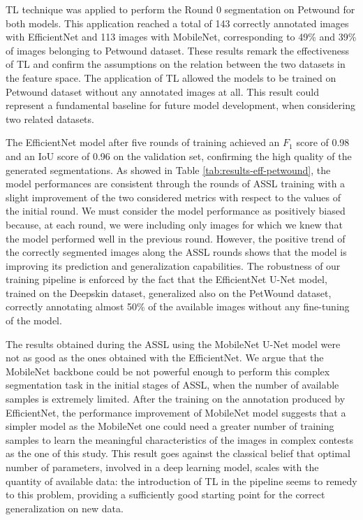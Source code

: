 \documentclass[../main.tex]{subfiles}
\begin{document}
TL technique was applied to perform the Round 0 segmentation on Petwound for both models. 
This application reached a total of 143 correctly annotated images with EfficientNet and 113 images with MobileNet, corresponding to 49\% and 39\% of images belonging to Petwound dataset. 
These results remark the effectiveness of TL and confirm the assumptions on the relation between the two datasets in the feature space. 
The application of TL allowed the models to be trained on Petwound dataset without any annotated images at all.
This result could represent a fundamental baseline for future model development, when considering two related datasets.

The EfficientNet model after five rounds of training achieved an $F_1$ score of 0.98 and an IoU score of 0.96 on the validation set, confirming the high quality of the generated segmentations.
As showed in Table \ref{tab:results-eff-petwound}, the model performances are consistent through the rounds of ASSL training with a slight improvement of the two considered metrics with respect to the values of the initial round. 
We must consider the model performance as positively biased because, at each round, we were including only images for which we knew that the model performed well in the previous round.
However, the positive trend of the correctly segmented images along the ASSL rounds shows that the model is improving its prediction and generalization capabilities. 
The robustness of our training pipeline is enforced by the fact that the EfficientNet U-Net model, trained on the Deepskin dataset, generalized also on the PetWound dataset, correctly annotating almost 50\% of the available images without any fine-tuning of the model.

The results obtained during the ASSL using the MobileNet U-Net model were not as good as the ones obtained with the EfficientNet.
We argue that the MobileNet backbone could be not powerful enough to perform this complex segmentation task in the initial stages of ASSL, when the number of available samples is extremely limited. 
After the training on the annotation produced by EfficientNet, the performance improvement of MobileNet model suggests that a simpler model as the MobileNet one could need a greater number of training samples to learn the meaningful characteristics of the images in complex contests as the one of this study.
This result goes against the classical belief that optimal number of parameters, involved in a deep learning model, scales with the quantity of available data: the introduction of TL in the pipeline seems to remedy to this problem, providing a sufficiently good starting point for the correct generalization on new data.
\end{document}
